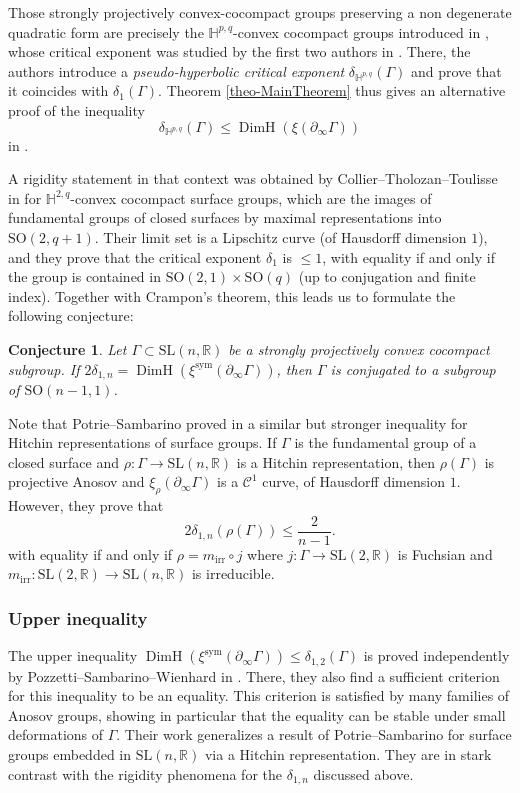 \documentclass[11pt]{article}
\numberwithin{equation}{section}
\newcommand{\irr}{\mathrm{irr}}
\newcommand{\sym}{\mathrm{sym}}
\newtheorem{conj}[theo]{Conjecture}
\theoremstyle{definition}
\newcommand{\R}{\mathbb{R}}
\newcommand{\Hyp}{\mathbb{H}}
\newcommand{\SL}{\mathrm{SL}}
\newcommand{\SO}{\mathrm{SO}}
\DeclareMathOperator{\DimH}{DimH}
\let\G\Gamma
\begin{document}
Those strongly projectively convex-cocompact groups preserving a non degenerate quadratic form are precisely the $\Hyp^{p,q}$-convex cocompact groups introduced in \cite{DGKSOpq}, whose critical exponent was studied by the first two authors in \cite{GM18}. There, the authors introduce a \emph{pseudo-hyperbolic critical exponent} $\delta_{\Hyp^{p,q}}(\G)$ and prove that it coincides with $\delta_1(\G)$. Theorem \ref{theo-MainTheorem} thus gives an alternative proof of the inequality
\[\delta_{\Hyp^{p,q}}(\G) \leq \DimH(\xi(\partial_\infty\Gamma))\]
in \cite[Th.\,1.2]{GM18}.

A rigidity statement in that context was obtained by Collier--Tholozan--Toulisse in \cite{CCT17} for $\Hyp^{2,q}$-convex cocompact surface groups, which are the images of fundamental groups of closed surfaces by maximal representations into $\SO(2,q+1)$. Their limit set is a Lipschitz curve (of Hausdorff dimension $1$), and they prove that the critical exponent $\delta_1$ is $\leq 1$, with equality if and only if the group is contained in $\SO(2,1)\times \SO(q)$ (up to conjugation and finite index). Together with Crampon's theorem, this leads us to formulate the following conjecture:

\begin{conj}
Let $\Gamma\!\subset\!\SL(n,\R)$ be a strongly projectively convex cocompact sub\-group. If $2\delta_{1,n} \!=\! \DimH(\xi^{\sym}(\partial_\infty \G))$, then $\G$ is conjugated to a subgroup of \hbox{$\SO(n-1,1)$}.
\end{conj}

Note that Potrie--Sambarino proved in \cite{potrie2014} a similar but stronger inequality for Hitchin representations of surface groups. If $\G$ is the fundamental group of a closed surface and $\rho:\G\to \SL(n,\R)$ is a Hitchin representation, then $\rho(\G)$ is projective Anosov and $\xi_\rho(\partial_\infty \G)$ is a $\mathcal{C}^1$ curve, of Hausdorff dimension $1$. However, they prove that
\[2\delta_{1,n}(\rho(\G)) \leq \frac{2}{n-1}.\]
with equality if and only if $\rho = m_{\irr} \circ j$ where $j:\G \to \SL(2,\R)$ is Fuchsian and $m_{\irr}: \SL(2,\R) \to \SL(n,\R)$ is irreducible.

\subsubsection*{Upper inequality}

The upper inequality $\DimH(\xi^{\sym}(\partial_\infty \G)) \leq \delta_{1,2}(\G)$ is proved inde\-pendently by Pozzetti--Sambarino--Wienhard in \cite{PSW19}. There, they also find a sufficient criterion for this inequality to be an equality. This criterion is satisfied by many families of Anosov groups, showing in particular that the equality can be stable under small deformations of $\G$. Their work generalizes a result of Potrie--Sambarino for surface groups embedded in $\SL(n,\R)$ via a Hitchin representation. They are in stark contrast with the rigidity phenomena for the $\delta_{1,n}$ discussed above.
\end{document}
